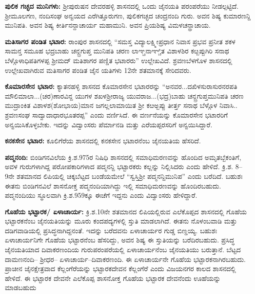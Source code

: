 \textbf{ಪುಲಿಕ ಗಚ್ಛದ ಮುನಿಗಳು:} ಶ‍್ರೀಪುರುಷನ ದೇವರಹಳ್ಳಿ ಶಾಸನದಲ್ಲಿ ಒಂದು ಜೈನಯತಿ ಪರಂಪರೆಯು ನೀಡಲ್ಪಟ್ಟಿದೆ. ಶ‍್ರೀಮೂಲಗಣ, ನಂದಿಸಂಘ ಅನ್ವಯದ ಎರೆಗಿತ್ತೂರುಗಣ, ಪುಲಿಕಗಚ್ಛದ ಚಂದ್ರನಂದಿ ಗುರು. ಅವನ ಶಿಷ್ಯ ಕುಮಾರಣನ್ದಿ ಮುನಿಪತಿ. ಅವನ ಶಿಷ್ಯ ಕೀರ್ತಿನನ್ದಾಚಾರ್ಯ ಮಹಾಮುನಿ. ಅವನ ಪ್ರಿಯಶಿಷ್ಯ ವಿಮಳಚನ್ದ್ರಾಚಾಯ.\textbf{ }

\textbf{ಮತಿಸಾಗರ ಪಂಡಿತ ಭಟಾರ:} ರಾಂಪುರ ಶಾಸನದಲ್ಲಿ “ಸಮಸ್ತ ವಿದ್ಯಾಲಕ್ಷ್ಮೀಪ್ರಧಾನ ನಿವಾಸ ಪ್ರಭವ ಪ್ರನೀತ ಶಕಳ ಸಾಮನ್ತ ಸಮೂಹ ಭದ್ರಬಾಹು ಚನ್ದ್ರಗುಪ್ತ ಮುನಿಪತಿ ಚರಣ ಲಾಞ್ಚನಾಞ್ಚಿತ ವಿಶಾಳಶಿರ ಕೞ್ಬಪ್ಪುಗಿರಿ ಸನಾಥ ಬೆಳ್ಗೊಳಾಧಿಪತಿಗಳಪ್ಪ ಶ‍್ರೀಮದ್​ ಮತಿಶಾಗರ ಪಣ್ಡಿತ ಭಟಾರರು” ಉಲ್ಲೇಖವಿದೆ. ಶ್ರವಣಬೆಳಗೊಳ ಶಾಸನದಲ್ಲಿ ಉಲ್ಲೇಖವಾಗಿರುವ ಮತಿಸಾಗರ ಪಂಡಿತ ಜೈನ ಯತಿಗಳು 12ನೇ ಶತಮಾನಕ್ಕೆ ಸೇರಿದವರು. 

\textbf{ಕೊಮಾರಸೇನ ಭಟಾರ:} ಕ್ಯಾತನಹಳ್ಳಿ ಶಾಸನದ ಕೊಮಾರಸೇನ ಭಟಾರರನ್ನು “ಅನವರ...ದಖಿಳಸುರಾಸುರನರಪತಿ ಮೌಲಿಮಾಲಾ...(ಚರ)ಣಾರವಿನ್ದ ಯುಗಳ ಶಖಳಶ‍್ರೀರಾಜ್ಯ ಯುವರಾಜ...(ಭದ್ರ)ಬಾಹು ಚನ್ದ್ರಗುಪ್ತಮುನಿಪತಿ ಚರಣ ಮುದ್ರಾಂಕಿತ ವಿಶಾಳಶ(ಶೋಭಾಯ)ಮಾನ ಜಗಲ್ಲಲಾಮಾಯಿತ ಶ‍್ರೀ ಕೞಅ್ಬಪ್ಪು ತೀರ್ತ್ತ ಸನಾಥ ಬೆಳ್ಗೊಳ ನಿವಾಸಿ.. ಶ್ರವಣಸಂಘ ಸಾದ್ವಾದಾಧಾರಭೂತರಪ್ಪ” ಎಂದು ವರ್ಣಿಸಿದೆ. ಈ ವರ್ಣನೆಯನ್ನು ಕೊಮಾರಸೇನ ಭಟಾರರಿಗೆ ಅನ್ವಯಿಸಿಕೊಳ್ಳಬೇಕು. ಇದನ್ನು ವಿದ್ವಾಂಸರು ಪೆರ್ಮಾನಡಿ ಮತ್ತು ಎರೆಯಪ್ಪರಸರಿಗೆ ಅನ್ವಯಿಸಿದ್ದಾರೆ. 

\textbf{ಕನಕಸೇನ ಭಟಾರ:} ಕೂಲಿಗೆರೆಯ ಶಾಸನದಲ್ಲಿ ಕನಕಸೇನ ಭಟಾರನೆಂಬ ಜೈನಯತಿಯ ಹೆಸರಿದೆ.

\textbf{ಪದ್ಮನಂದಿ:} ಬಿಂಡಿಗನವಿಲೆಯ ಕ್ರಿ.ಶ.975ರ ನಿಷಿಧಿ ಶಾಸನದಲ್ಲಿ ಸಮಾಧಿಮರಣವನ್ನು ಹೊಂದಿದ ಅಮೃತಬ್ಬೆಕಂತಿಗೆ, ಅವಳ ಗುರುಗಳಾಗಿದ್ದ ಪರೋಪಕಾರಿಗಳಾದ ಪದ್ಮನನ್ದಿ ಭಟ್ಟಾರಕರು ಕಲ್ಲನ್ನು ನಿಲ್ಲಿಸಿದರು ಎಂದು ಹೇಳಿದೆ. ಕ್ರಿ.ಶ. 8–9ನೇ ಶತಮಾನದ ಲಿಪಿಯಲ್ಲಿ ಚಿಕ್ಕಬೆಟ್ಟದ ಬಂಡೆಯಮೇಲೆ “ಸ್ವಸ್ತಿಶ‍್ರೀ ಪದ್ಮನನ್ದಿಮುನಿಪ” ಎಂದು ಬರೆದಿದೆ. ಬಹುಶಃ ಈತನು ಬಿಂಡಿಗನವಿಲೆ ಶಾಸನೋಕ್ತ ಪದ್ಮನಂದಿಯಾಗಿದ್ದು ಇಲ್ಲಿ ಸಮಾಧಿಮರಣವನ್ನು ಹೊಂದಿರಬಹುದು. ಪದ್ಮನಂದಿಯು ಸ್ಥೂಲವಾಗಿ ಕ್ರಿ.ಶ.959ಕ್ಕೂ ಈಚೆಗೆ ಇದ್ದನು ಎಂದು ವಿದ್ವಾಂಸರು ಹೇಳಿದ್ದಾರೆ.

\textbf{ಗೊಹೆಯ ಭಟ್ಟಾರಕ/ ಏಳಾಚಾರ್ಯ:} ಕ್ರಿ.ಶ.10ನೇ ಶತಮಾನದ ಲಿಪಿಯಲ್ಲಿರುವ ಎಲೆಕೊಪ್ಪದ ಶಾಸನದಲ್ಲಿ ಗೊಹೆಯ ಭಟ್ಟಾರಕನೆಂಬ ಜೈನಯತಿಯನ್ನು ಮೂರು ಕಂದಪದ್ಯಗಳಲ್ಲಿ ಸ್ತುತಿ ಮಾಡಲಾಗಿದೆ. ಈತನು ನೊಳಂಬವಾಡಿ ಮತ್ತು ದಡಿಗವಾಡಿಯಲ್ಲಿ ಪ್ರಸಿದ್ಧನಾಗಿದ್ದನಂತೆ. ಇದನ್ನು ಬರೆದವನು ಏಳಾಚಾರ್ಯರ ಗುಡ್ಡ ಬಿಣ್ಡಯ್ಯ. ಬಹುಶಃ ಏಳಾಚಾರ್ಯನಿಗೇ ಗೊಹೆಯ ಭಟ್ಟಾರನೆಂಬ ಹೆಸರಿದ್ದು, ಅವನ ಶಿಷ್ಯ ಈ ಸ್ತುತಿಯನ್ನು ಬರೆದಿರಬಹುದು. ಪ್ರಸಿದ್ಧ ಜೈನಯತಿಯಾದ ದಿವಾಕರಣಂದಿಯ ಗುರುಪರಂಪರೆಯಲ್ಲಿ ಏಳಾಚಾರ್ಯನೆಂಬ ಜೈನಯತಿಯು ಬರುತ್ತಾನೆ. ಬೆಟ್ಟದ ದಾಮಣನಂದಿ– ಶ‍್ರೀಧರ– ಏಳಾಚಾರ್ಯ–ದಿವಾಕರಣಂದಿ. ಈ ಏಳಾಚಾರ್ಯನೇ ಗೊಹೆಯ ಭಟ್ಟಾರಕನಾಗಿರಬಹುದು. ಪ್ರಾಚೀನ ಜೈನಕ್ಷೇತ್ರವಾದ ಕೆಲ್ಲಂಗೆರೆಯನ್ನು ಭಟ್ಟಾರಕದೇವನ ಕೆಲ್ಲಂಗೆರೆ ಎಂದು ವಿಜಯನಗರ ಕಾಲದ ಶಾಸನದಲ್ಲಿ ಹೇಳಿದೆ. ಈ ಭಟ್ಟಾರಕ ದೇವನೇ ಎಲೆಕೊಪ್ಪ ಶಾಸನೋಕ್ತ ಗೊಹೆಯ ಭಟ್ಟಾರಕ ದೇವನೆಂದು ಊಹೆಯನ್ನು ಮಾಡಬಹುದು 

